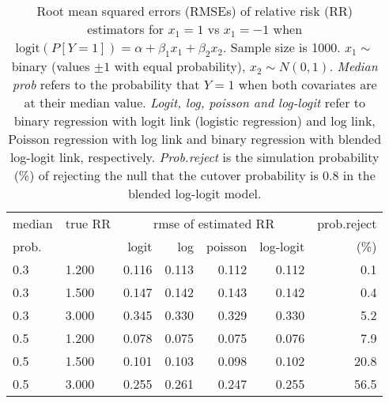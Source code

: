 \documentclass[12pt,a4paper]{article}
\begin{document}
\begin{table}[H] 
\small\sf\centering 
\caption{Root mean squared errors (RMSEs) of relative risk (RR) estimators for $x_1=1$ vs $x_1=-1$ when $\mbox{logit}(P[Y=1])=\alpha+\beta_1 x_1 + \beta_2 x_2$. Sample size is 1000. $x_1 \sim $binary (values $\pm 1$ with equal probability), $x_2 \sim N(0,1)$. {\it Median prob} refers to the probability that $Y=1$ when both covariates are at their median value. {\it Logit, log, poisson and log-logit} refer to binary regression with logit link (logistic regression) and log link, Poisson regression with log link and binary regression with blended log-logit link, respectively. {\it Prob.reject} is the simulation probability (\%) of rejecting the null that the cutover probability is $0.8$ in the blended log-logit model.} 
\begin{tabular}{llrrrrr} 
\toprule 
median & true RR & \multicolumn{4}{c}{rmse of estimated RR} & prob.reject \\ 
prob. & & logit & log & poisson & log-logit  & (\%) \\ \midrule 
0.3 & 1.200 & 0.116 & 0.113 & 0.112 & 0.112 &  0.1 \\  
0.3 & 1.500 & 0.147 & 0.142 & 0.143 & 0.142 &  0.4 \\  
0.3 & 3.000 & 0.345 & 0.330 & 0.329 & 0.330 &  5.2 \\  
0.5 & 1.200 & 0.078 & 0.075 & 0.075 & 0.076 &  7.9 \\  
0.5 & 1.500 & 0.101 & 0.103 & 0.098 & 0.102 & 20.8 \\  
0.5 & 3.000 & 0.255 & 0.261 & 0.247 & 0.255 & 56.5 \\  
\bottomrule 
\end{tabular} 
\end{table} 
\end{document}
